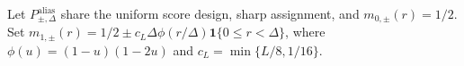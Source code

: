 Let \(P^{\mathrm{alias}}_{\pm,\Delta}\) share the uniform score design, sharp assignment, and \(m_{0,\pm}(r)=1/2\). Set \(m_{1,\pm}(r)=1/2\pm c_L\Delta\phi(r/\Delta)\mathbf1\{0\leq r<\Delta\}\), where \(\phi(u)=(1-u)(1-2u)\) and \(c_L=\min\{L/8,1/16\}\).